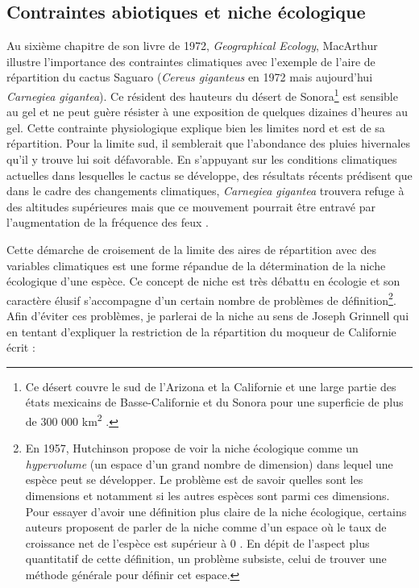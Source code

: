 \subsection*{Contraintes abiotiques et niche
écologique}\label{contraintes-abiotiques-et-niche-uxe9cologique}

Au sixième chapitre de son livre de 1972, \emph{Geographical Ecology},
MacArthur illustre l'importance des contraintes climatiques avec
l'exemple de l'aire de répartition du cactus Saguaro (\emph{Cereus
giganteus} en 1972 mais aujourd'hui \emph{Carnegiea gigantea}). Ce
résident des hauteurs du désert de Sonora\footnote{Ce désert couvre le
  sud de l'Arizona et la Californie et une large partie des états
  mexicains de Basse-Californie et du Sonora pour une superficie de plus
  de 300 000 km\textsuperscript{2} .} est sensible au gel et ne peut
guère résister à une exposition de quelques dizaines d'heures au gel.
Cette contrainte physiologique explique bien les limites nord et est de
sa répartition. Pour la limite sud, il semblerait que l'abondance des
pluies hivernales qu'il y trouve lui soit défavorable. En s'appuyant sur
les conditions climatiques actuelles dans lesquelles le cactus se
développe, des résultats récents prédisent que dans le cadre des
changements climatiques, \emph{Carnegiea gigantea} trouvera refuge à des
altitudes supérieures mais que ce mouvement pourrait être entravé par
l'augmentation de la fréquence des feux \citep{Springer2015}.

Cette démarche de croisement de la limite des aires de répartition avec
des variables climatiques est une forme répandue de la détermination de
la niche écologique d'une espèce. Ce concept de niche est très débattu
en écologie et son caractère élusif s'accompagne d'un certain nombre de
problèmes de définition\footnote{En 1957, Hutchinson propose de voir la
  niche écologique comme un \emph{hypervolume} (un espace d'un grand
  nombre de dimension) dans lequel une espèce peut se développer. Le
  problème est de savoir quelles sont les dimensions et notamment si les
  autres espèces sont parmi ces dimensions. Pour essayer d'avoir une
  définition plus claire de la niche écologique, certains auteurs
  proposent de parler de la niche comme d'un espace où le taux de
  croissance net de l'espèce est supérieur à 0 \citep{Chase2003}. En
  dépit de l'aspect plus quantitatif de cette définition, un problème
  subsiste, celui de trouver une méthode générale pour définir cet
  espace.}. Afin d'éviter ces problèmes, je parlerai de la niche au sens
de Joseph Grinnell qui en tentant d'expliquer la restriction de la
répartition du moqueur de Californie écrit :

